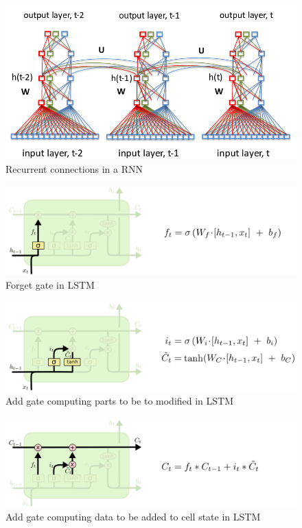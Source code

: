 \documentclass[conference]{IEEEtran}
\begin{document}
\begin{figure}
    \includegraphics[width=.99\linewidth]{img/rnn.png}  
    \caption{Recurrent connections in a RNN}
    \label{fig:rnn}
\end{figure}

\begin{figure}
    \includegraphics[width=.99\linewidth]{img/lstm_forget.png}  
    \caption{Forget gate in LSTM} 
    \label{fig:lstm_forget}
\end{figure}

\begin{figure}
    \includegraphics[width=.99\linewidth]{img/lstm_add.png}  
    \caption{Add gate computing parts to be to modified in LSTM} 
    \label{fig:lstm_add}
\end{figure}

\begin{figure}
    \includegraphics[width=.99\linewidth]{img/lstm_add1.png}  
    \caption{Add gate computing data to be added to cell state in LSTM} 
    \label{fig:lstm_add1}
\end{figure}
\end{document}
